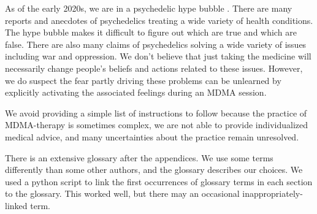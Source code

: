 \documentclass[12pt,letterpaper]{book}
\begin{document}
As of the early 2020s, we are in a psychedelic hype bubble \cite{yaden2022preparing}. There are many reports and anecdotes of psychedelics treating a wide variety of health conditions. The hype bubble makes it difficult to figure out which are true and which are false. There are also many claims of psychedelics solving a wide variety of issues including war and oppression. We don't believe that just taking the medicine will necessarily change people's beliefs and actions related to these issues. However, we do suspect the fear partly driving these problems can be unlearned by explicitly activating the associated feelings during an MDMA session.



We avoid providing a simple list of instructions to follow because the practice of MDMA-therapy is sometimes complex, we are not able to provide individualized medical advice, and many uncertainties about the practice remain unresolved.

There is an extensive glossary after the appendices. We use some terms differently than some other authors, and the glossary describes our choices. We used a python script to link the first occurrences of glossary terms in each section to the glossary. This worked well, but there may an occasional inappropriately-linked term.
\end{document}
